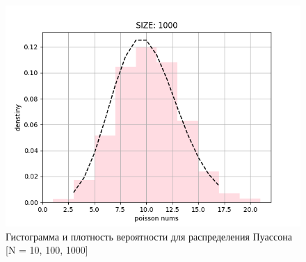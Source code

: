 \begin{itemize}
\begin{figure}[H]
\begin{center}
			\includegraphics[scale=0.333]{resources/poisson1000.png}
			\caption{Гистограмма и плотность вероятности для распределения Пуассона [N = 10, 100, 1000]} 
		\end{center}
	\end{figure}
	

\end{itemize}
